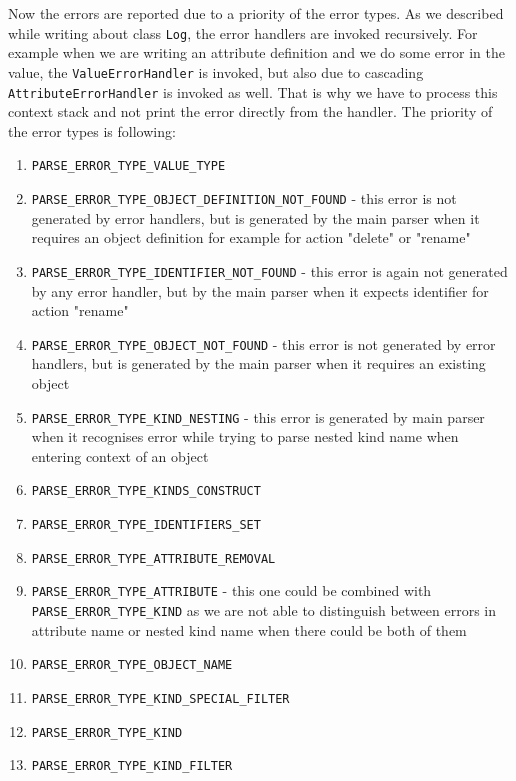 \documentclass[deska]{subfiles}
\begin{document}
Now the errors are reported due to a priority of the error types. As we described while writing about class {\tt Log},
the error handlers are invoked recursively. For example when we are writing an attribute definition and we do some error
in the value, the {\tt ValueErrorHandler} is invoked, but also due to cascading {\tt AttributeErrorHandler} is invoked as well.
That is why we have to process this context stack and not print the error directly from the handler.
The priority of the error types is following:

\begin{enumerate}
    \item {\tt PARSE\_ERROR\_TYPE\_VALUE\_TYPE}
    \item {\tt PARSE\_ERROR\_TYPE\_OBJECT\_DEFINITION\_NOT\_FOUND} - this error is not generated by error handlers, but is
                                                               generated by the main parser when it requires an object definition
                                                               for example for action "delete" or "rename"
    \item {\tt PARSE\_ERROR\_TYPE\_IDENTIFIER\_NOT\_FOUND} - this error is again not generated by any error handler, but by the main
                                                        parser when it expects identifier for action "rename"
    \item {\tt PARSE\_ERROR\_TYPE\_OBJECT\_NOT\_FOUND} - this error is not generated by error handlers, but is
                                                    generated by the main parser when it requires an existing object
    \item {\tt PARSE\_ERROR\_TYPE\_KIND\_NESTING} - this error is generated by main parser when it recognises error while trying
                                                to parse nested kind name when entering context of an object
    \item {\tt PARSE\_ERROR\_TYPE\_KINDS\_CONSTRUCT}
    \item {\tt PARSE\_ERROR\_TYPE\_IDENTIFIERS\_SET}
    \item {\tt PARSE\_ERROR\_TYPE\_ATTRIBUTE\_REMOVAL}
    \item {\tt PARSE\_ERROR\_TYPE\_ATTRIBUTE} - this one could be combined with {\tt PARSE\_ERROR\_TYPE\_KIND} as we are not able
                                             to distinguish between errors in attribute name or nested kind name when
                                             there could be both of them
    \item {\tt PARSE\_ERROR\_TYPE\_OBJECT\_NAME}
    \item {\tt PARSE\_ERROR\_TYPE\_KIND\_SPECIAL\_FILTER}
    \item {\tt PARSE\_ERROR\_TYPE\_KIND}
    \item {\tt PARSE\_ERROR\_TYPE\_KIND\_FILTER}
\end{enumerate}
\end{document}
